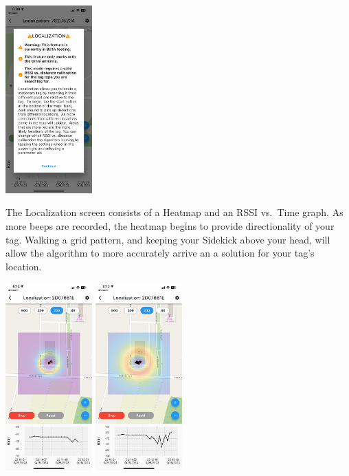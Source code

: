 \documentclass[
]{article}
\begin{document}
\includegraphics[width=0.25\textwidth,height=\textheight]{./images/sidekick_LocalizationWarn.PNG}

The Localization screen consists of a Heatmap and an RSSI vs.~Time
graph. As more beeps are recorded, the heatmap begins to provide
directionality of your tag. Walking a grid pattern, and keeping your
Sidekick above your head, will allow the algorithm to more accurately
arrive an a solution for your tag's location.

\includegraphics[width=0.25\textwidth,height=\textheight]{./images/sidekick_localization1.PNG}
\includegraphics[width=0.25\textwidth,height=\textheight]{./images/sidekick_localizationFinal.PNG}
\end{document}
